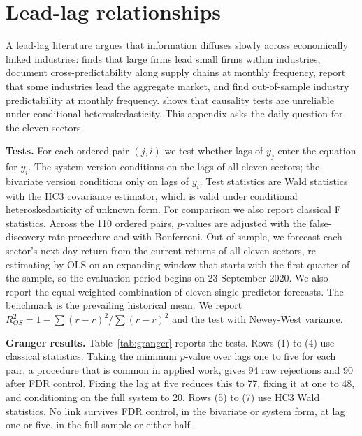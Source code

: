 \documentclass[11pt]{article}
\begin{document}
\appendix
\renewcommand{\thetable}{\thesection\arabic{table}}
\section{Lead-lag relationships}\label{app:leadlag}
\setcounter{table}{0}

A lead-lag literature argues that information diffuses slowly across economically linked industries: \citet{hou2007} finds that large firms lead small firms within industries, \citet{menzly2010} document cross-predictability along supply chains at monthly frequency, \citet{hong2007} report that some industries lead the aggregate market, and \citet{rapach2019} find out-of-sample industry predictability at monthly frequency. \citet{vilasuso2001} shows that causality tests are unreliable under conditional heteroskedasticity. This appendix asks the daily question for the eleven sectors.

\textbf{Tests.} For each ordered pair $(j, i)$ we test whether lags of $y_j$ enter the equation for $y_i$. The system version conditions on the lags of all eleven sectors; the bivariate version conditions only on lags of $y_i$. Test statistics are Wald statistics with the HC3 covariance estimator, which is valid under conditional heteroskedasticity of unknown form. For comparison we also report classical F statistics. Across the 110 ordered pairs, $p$-values are adjusted with the \citet{benjamini1995} false-discovery-rate procedure and with Bonferroni. Out of sample, we forecast each sector's next-day return from the current returns of all eleven sectors, re-estimating by OLS on an expanding window that starts with the first quarter of the sample, so the evaluation period begins on 23 September 2020. We also report the equal-weighted combination of eleven single-predictor forecasts. The benchmark is the prevailing historical mean. We report $R^2_{OS} = 1 - \sum(r - \hat r)^2/\sum(r-\bar r)^2$ \citep{campbell2008} and the \citet{clark2007} test with Newey-West variance.

\textbf{Granger results.} Table~\ref{tab:granger} reports the tests. Rows (1) to (4) use classical statistics. Taking the minimum $p$-value over lags one to five for each pair, a procedure that is common in applied work, gives 94 raw rejections and 90 after FDR control. Fixing the lag at five reduces this to 77, fixing it at one to 48, and conditioning on the full system to 20. Rows (5) to (7) use HC3 Wald statistics. No link survives FDR control, in the bivariate or system form, at lag one or five, in the full sample or either half.
\end{document}
